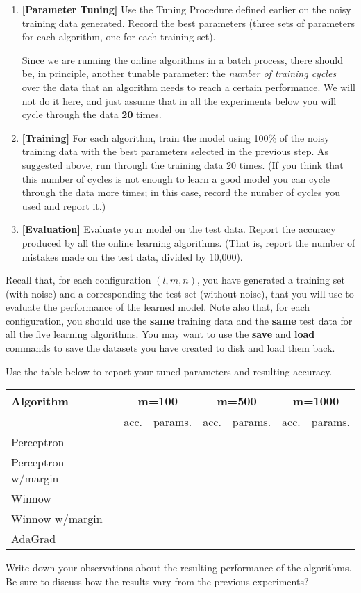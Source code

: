 \begin{enumerate}
\begin{enumerate}
\item {\bf [Parameter Tuning]} Use the Tuning Procedure defined earlier on the noisy
training data generated. Record the best parameters (three sets of
parameters for each algorithm, one for each training set).

Since we are running the online algorithms in a batch process, there
should be, in principle, another tunable parameter: the {\em number of
training cycles} over the data that an algorithm needs to reach a
certain performance. We will not do it here, and just assume that in
all the experiments below you will cycle through the data {\bf 20}
times.

\item {\bf [Training]} For each algorithm, train the model using 100\%
  of the noisy training data with the best parameters selected in the
  previous step. As suggested above, run through the training data 20
  times. (If you think that this number of cycles is not enough to
  learn a good model you can cycle through the data more times; in
  this case, record the number of cycles you used and report it.)

\item {\bf [Evaluation]} Evaluate your model on the test data. Report the accuracy produced by all the online learning algorithms. (That is, report the number of mistakes made on the test data, divided by 10,000).
\end{enumerate}

Recall that, for each configuration $(l, m, n)$, you have generated a
training set (with noise) and a corresponding the test set (without noise), that you
will use to evaluate the performance of the learned model. Note also
that, for each configuration, you should use the {\bf same} training data
and the {\bf same} test data for all the five learning algorithms. You may
want to use the {\bf save} and {\bf load} commands to save the
datasets you have created to disk and load them back.

\newpage
Use the table below to report your tuned parameters and resulting accuracy.

\begin{center}
  \begin{tabular}{|l|l|l|l|l|l|l|}
\hline
 Algorithm      &  \multicolumn{2}{c|}{m=100} & \multicolumn{2}{c|}{m=500} & \multicolumn{2}{c|}{m=1000}\\\hline\hline
 & acc. & params. & acc. & params. & acc. & params.\\\hline
 Perceptron     & & & & & &\\\hline
 Perceptron w/margin & & & & & &\\\hline
 Winnow              & & & & & &\\\hline
 Winnow w/margin     & & & & & &\\\hline
 AdaGrad & & & & & &\\\hline
\end{tabular}
\end{center}
  Write down your observations about the resulting performance of the algorithms.
  Be sure to discuss how the results vary from the previous experiments?


\end{enumerate}

